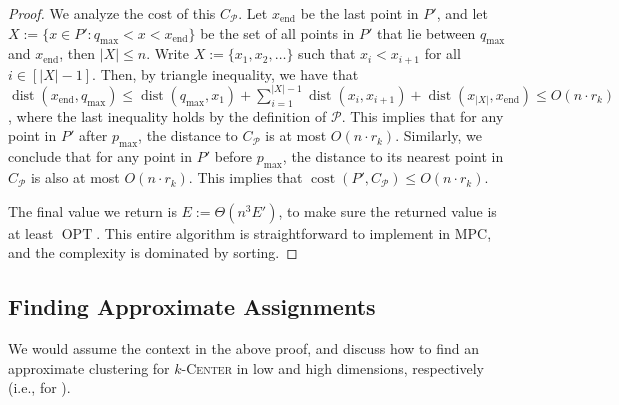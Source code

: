 \documentclass[11pt,letterpaper]{article}
\theoremstyle{plain}
\theoremstyle{definition}
\theoremstyle{remark}
\newcommand{\ProblemName}[1]{\textsc{#1}}
\newcommand{\kCenter}{$k$-\ProblemName{Center}\xspace}
\DeclareMathOperator{\cost}{cost}
\DeclareMathOperator{\OPT}{OPT}
\DeclareMathOperator{\dist}{dist}
\begin{document}
\begin{proof}
We analyze the cost of this $C_{\mathcal{P}}$. 
Let $x_{\mathrm{end}}$ be the last point in $P'$, and let $X:= \{x\in P': q_{\max} < x < x_{\mathrm{end}} \}$ be the set of all points in $P'$ that lie between $q_{\max}$ and $x_{\mathrm{end}}$, then $|X|\leq n$. 
Write $X := \{x_1, x_2, \ldots \}$
such that $x_{i}< x_{i+1}$ for all $i\in [|X| - 1]$. 
Then, by triangle inequality, we have that $\dist(x_{\mathrm{end}}, q_{\max})\leq \dist(q_{\max}, x_{1}) + \sum_{i=1}^{|X|-1}\dist(x_{i}, x_{i+1}) + \dist(x_{|X|}, x_{\mathrm{end}})\leq O(n\cdot r_{k})$,
where the last inequality holds by the definition of $\mathcal{P}$.  
This implies that for any point in $P'$ after $p_{\max}$, the distance to $C_{\mathcal{P}}$ is at most $O(n\cdot r_{k})$. 
Similarly, we conclude that for any point in $P'$ before $p_{\max}$, the distance to its nearest point in $C_{\mathcal{P}}$ is also at most $O(n\cdot r_{k})$. 
This implies that $\cost(P', C_{\mathcal{P}})\leq O(n\cdot r_{k})$. 

The final value we return is $E := \Theta(n^3 E')$, to make sure the returned value is at least $\OPT$.
This entire algorithm is straightforward to implement in MPC, and the complexity is dominated by sorting.
\end{proof}





\subsection{Finding Approximate Assignments}
\label{sec:assignment}
We would assume the context in the above proof, and discuss how to find an approximate clustering for \kCenter in low and high dimensions, respectively (i.e., for ). 
\end{document}
